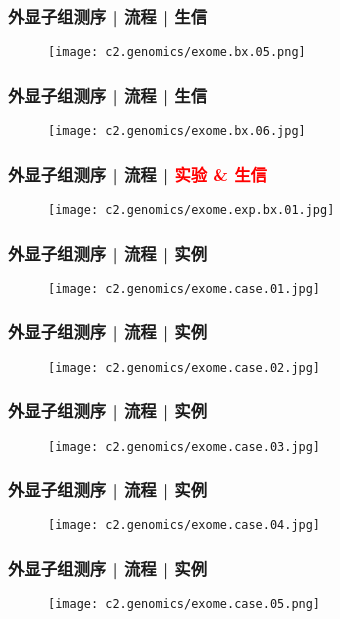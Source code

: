 \begin{frame}
  \frametitle{外显子组测序 | 流程 | 生信}
  \begin{figure}
    \centering
    \texttt{[image: c2.genomics/exome.bx.05.png]}
  \end{figure}
\end{frame}

\begin{frame}
  \frametitle{外显子组测序 | 流程 | 生信}
  \begin{figure}
    \centering
    \texttt{[image: c2.genomics/exome.bx.06.jpg]}
  \end{figure}
\end{frame}

\begin{frame}
  \frametitle{外显子组测序 | 流程 | \textcolor{red}{实验 \& 生信}}
  \begin{figure}
    \centering
    \texttt{[image: c2.genomics/exome.exp.bx.01.jpg]}
  \end{figure}
\end{frame}

\begin{frame}
  \frametitle{外显子组测序 | 流程 | 实例}
  \begin{figure}
    \centering
    \texttt{[image: c2.genomics/exome.case.01.jpg]}
  \end{figure}
\end{frame}

\begin{frame}
  \frametitle{外显子组测序 | 流程 | 实例}
  \begin{figure}
    \centering
    \texttt{[image: c2.genomics/exome.case.02.jpg]}
  \end{figure}
\end{frame}

\begin{frame}
  \frametitle{外显子组测序 | 流程 | 实例}
  \begin{figure}
    \centering
    \texttt{[image: c2.genomics/exome.case.03.jpg]}
  \end{figure}
\end{frame}

\begin{frame}
  \frametitle{外显子组测序 | 流程 | 实例}
  \begin{figure}
    \centering
    \texttt{[image: c2.genomics/exome.case.04.jpg]}
  \end{figure}
\end{frame}

\begin{frame}
  \frametitle{外显子组测序 | 流程 | 实例}
  \begin{figure}
    \centering
    \texttt{[image: c2.genomics/exome.case.05.png]}
  \end{figure}
\end{frame}

